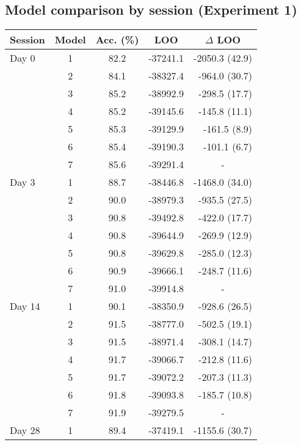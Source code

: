\documentclass[a4paper,12pt]{article}
\begin{document}
\begin{refsection}[supp]
\clearpage
\subsection*{Model comparison by session (Experiment 1)}

\begin{table}[h!]
    \centering
    \small
    \begin{tabular}{lcccr}
        \toprule
        Session & Model & Acc. (\%) & LOO & \multicolumn{1}{c}{$\Delta$ LOO} \\
        \midrule
         Day 0 & 1 & 82.2 & -37241.1 & -2050.3 (42.9) \\
         & 2 & 84.1 & -38327.4 & -964.0 (30.7) \\
         & 3 & 85.2 & -38992.9 & -298.5 (17.7) \\
         & 4 & 85.2 & -39145.6 & -145.8 (11.1) \\
         & 5 & 85.3 & -39129.9 & -161.5 (8.9) \\
         & 6 & 85.4 & -39190.3 & -101.1 (6.7) \\
         & 7 & 85.6 & -39291.4 & \multicolumn{1}{c}{-} \\
         \midrule
         Day 3 & 1 & 88.7 & -38446.8 & -1468.0 (34.0) \\
         & 2 & 90.0 & -38979.3 & -935.5 (27.5) \\
         & 3 & 90.8 & -39492.8 & -422.0 (17.7) \\
         & 4 & 90.8 & -39644.9 & -269.9 (12.9) \\
         & 5 & 90.8 & -39629.8 & -285.0 (12.3) \\
         & 6 & 90.9 & -39666.1 & -248.7 (11.6) \\
         & 7 & 91.0 & -39914.8 & \multicolumn{1}{c}{-} \\
         \midrule
         Day 14 & 1 & 90.1 & -38350.9 & -928.6 (26.5) \\
         & 2 & 91.5 & -38777.0 & -502.5 (19.1) \\
         & 3 & 91.5 & -38971.4 & -308.1 (14.7) \\
         & 4 & 91.7 & -39066.7 & -212.8 (11.6) \\
         & 5 & 91.7 & -39072.2 & -207.3 (11.3) \\
         & 6 & 91.8 & -39093.8 & -185.7 (10.8) \\
         & 7 & 91.9 & -39279.5 & \multicolumn{1}{c}{-} \\
         \midrule
         Day 28 & 1 & 89.4 & -37419.1 & -1155.6 (30.7) \\

\end{tabular}
\end{table}
\end{refsection}
\end{document}
